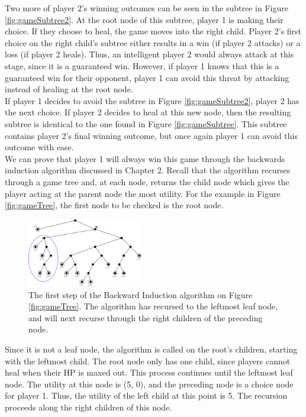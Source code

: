 Two more of player 2's winning outcomes can be seen in the subtree in Figure \ref{fig:gameSubtree2}. At the root node of this subtree, player 1 is making their choice. If they choose to heal, the game moves into the right child. Player 2's first choice on the right child's subtree either results in a win (if player 2 attacks) or a loss (if player 2 heals). Thus, an intelligent player 2 would always attack at this stage, since it is a guaranteed win. However, if player 1 knows that this is a guaranteed win for their opponent, player 1 can avoid this threat by attacking instead of healing at the root node.\\

If player 1 decides to avoid the subtree in Figure \ref{fig:gameSubtree2}, player 2 has the next choice. If player 2 decides to heal at this new node, then the resulting subtree is identical to the one found in Figure \ref{fig:gameSubtree}. This subtree contains player 2's final winning outcome, but once again player 1 can avoid this outcome with ease.\\

We can prove that player 1 will always win this game through the backwards induction algorithm discussed in Chapter 2. Recall that the algorithm recurses through a game tree and, at each node, returns the child node which gives the player acting at the parent node the most utility. For the example in Figure \ref{fig:gameTree}, the first node to be checked is the root node.\\

\begin{figure}
  \centering
  \includegraphics[height=3cm]{figures/Backwards1.png}
  \caption{The first step of the Backward Induction algorithm on Figure \ref{fig:gameTree}. The algorithm has recursed to the leftmost leaf node, and will next recurse through the right children of the preceding node.}
\end{figure}

Since it is not a leaf node, the algorithm is called on the root's children, starting with the leftmost child. The root node only has one child, since players cannot heal when their HP is maxed out. This process continues until the leftmost leaf node. The utility at this node is (5, 0), and the preceding node is a choice node for player 1. Thus, the utility of the left child at this point is 5. The recursion proceeds along the right children of this node.

